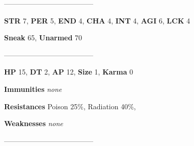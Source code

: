\documentclass[11pt,a4paper,twocolumn]{book}
\begin{document}
	--------------------------------------

\noindent
\textbf{STR} 7, \textbf{PER} 5, \textbf{END} 4, \textbf{CHA} 4, \textbf{INT} 4, \textbf{AGI} 6, \textbf{LCK} 4

\noindent
\textbf{Sneak} 65, \textbf{Unarmed} 70 %

--------------------------------------

\noindent
\textbf{HP} 15, \textbf{DT} 2, \textbf{AP} 12, \textbf{Size} 1, \textbf{Karma} 0


\noindent
\textbf{Immunities} \emph{none} %

\noindent
\textbf{Resistances} Poison 25\%, Radiation 40\%,%

\noindent
\textbf{Weaknesses} \emph{none}%

--------------------------------------
	
\end{document}
